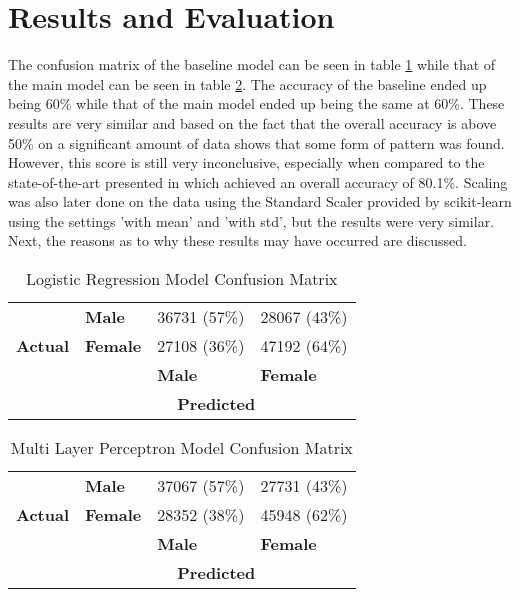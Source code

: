 \section{Results and Evaluation}
The confusion matrix of the baseline model can be seen in table \ref{tbl:baseline} while that of the main model can be seen in table \ref{tbl:main}. The accuracy of the baseline ended up being 60\% while that of the main model ended up being the same at 60\%. These results are very similar and based on the fact that the overall accuracy is above 50\% on a significant amount of data shows that some form of pattern was found. However, this score is still very inconclusive, especially when compared to the state-of-the-art presented in \cite{2} which achieved an overall accuracy of 80.1\%. Scaling was also later done on the data using the Standard Scaler provided by scikit-learn using the settings 'with mean' and 'with std', but the results were very similar. Next, the reasons as to why these results may have occurred are discussed.

\begin{table}[] \label{tbl:baseline}
	\renewcommand{\arraystretch}{1.3}
	\centering
	\begin{tabular}{|c|l|l|l|}
		\hline
		\multirow{3}{*}{\textbf{Actual}} & \textbf{Male}   & 36731 (57\%)  & 28067 (43\%)    \\ \cline{2-4} 
		& \textbf{Female} & 27108 (36\%)  & 47192 (64\%)    \\ \cline{2-4} 
		&                 & \textbf{Male} & \textbf{Female} \\ \hline
		\multicolumn{1}{|l|}{}           & \multicolumn{3}{c|}{\textbf{Predicted}}           \\ \hline
	\end{tabular}
	\caption{Logistic Regression Model Confusion Matrix}
\end{table}

\begin{table}[]\label{tbl:main}
	\renewcommand{\arraystretch}{1.3}
	\centering
	\begin{tabular}{|c|l|l|l|}
		\hline
		\multirow{3}{*}{\textbf{Actual}} & \textbf{Male}   & 37067 (57\%)  & 27731 (43\%)    \\ \cline{2-4} 
		& \textbf{Female} & 28352 (38\%)  & 45948 (62\%)    \\ \cline{2-4} 
		&                 & \textbf{Male} & \textbf{Female} \\ \hline
		\multicolumn{1}{|l|}{}           & \multicolumn{3}{c|}{\textbf{Predicted}}           \\ \hline
	\end{tabular}
	\caption{Multi Layer Perceptron Model Confusion Matrix}
\end{table}

